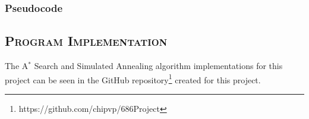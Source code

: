\documentclass[conference]{IEEEtran}
\begin{document}
\subsubsection{Pseudocode}


\subsection{\textsc{Program Implementation}} \label{sec:code}

The A$^*$ Search and Simulated Annealing algorithm implementations for this
project 
can be seen in the
GitHub repository\footnote{https://github.com/chipvp/686Project} created for
this project.
\end{document}
